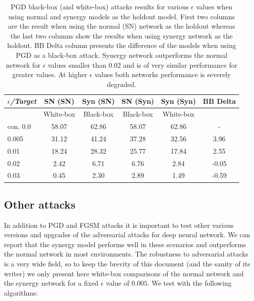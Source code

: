 \documentclass[b5paper]{book}
\begin{document}
\begin{table}[ht]
  \centering
  \begin{tabular}{l|cc|cc|c}
    \toprule
     \textit{\(\epsilon\)/Target} & {SN (SN)} & {Syn (SN)} & {SN (Syn)} & {Syn (Syn)} & BB Delta \\
    \midrule
    {} & {White-box} & {Black-box} & {Black-box} & {White-box} & {} \\
    \midrule
    {con. 0.0} & {58.07} & {62.86}  & {58.07} & {62.86} & {-} \\
    {0.005} & {31.12} & {41.24}  & {37.28} & {32.56} & {3.96} \\
    {0.01} & {18.24} & {28.32}  & {25.77} & {17.84} & {2.55} \\
    {0.02} & {2.42} & {6.71}  & {6.76} & {2.84} & {-0.05} \\
    {0.03} & {0.45} & {2.30}  & {2.89} & {1.49} & {-0.59} \\
    \bottomrule
  \end{tabular}
  \caption{PGD black-box (and white-box) attacks results for various \( \epsilon \) values when using normal and synergy models as the holdout model. First two columns are the result when using the normal (SN) network as the holdout whereas the last two columns show the results when using synergy network as the holdout. BB Delta column presents the difference of the models when using PGD as a black-box attack. Synergy network outperforms the normal network for \( \epsilon \) values smaller than 0.02 and is of very similar performance for greater values. At higher \( \epsilon \) values both networks performance is severely degraded.}
  \label{tab:results-pgd-synergy}
\end{table} 

\subsection{Other attacks}

In addition to PGD and FGSM attacks it is important to test other various versions and upgrades of the adversarial attacks for deep neural network. We can report that the synergy model performs well in these scenarios and outperforms the normal network in most environments. The robustness to adversarial attacks is a very wide field, so to keep the brevity of this document (and the sanity of its writer) we only present here white-box comparisons of the normal network and the synergy network for a fixed \( \epsilon \) value of \( 0.005 \). We test with the following algorithms:
\end{document}
